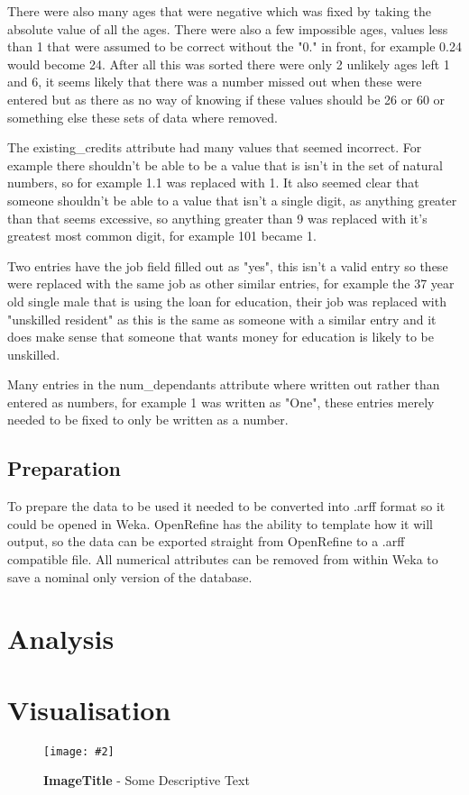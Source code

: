 \documentclass[12pt, a4paper]{article}
\newcommand{\figuremacro}[5]{
	\begin{figure}[#1]
		\centering
		\texttt{[image: \#2]}
		\caption[#3]{\textbf{#3}#4}
		\label{fig:#2}
	\end{figure}
}
\begin{document}
	There were also many ages that were negative which was fixed by taking the absolute value of all the ages. There were also a few impossible ages, values less than 1 that were assumed to be correct without the "0." in front, for example 0.24 would become 24. After all this was sorted there were only 2 unlikely ages left 1 and 6, it seems likely that there was a number missed out when these were entered but as there as no way of knowing if these values should be 26 or 60 or something else these sets of data where removed.
	
	The existing\_credits attribute had many values that seemed incorrect. For example there shouldn't be able to be a value that is isn't in the set of natural numbers, so for example 1.1 was replaced with 1. It also seemed clear that someone shouldn't be able to a value that isn't a single digit, as anything greater than that seems excessive, so anything greater than 9 was replaced with it's greatest most common digit, for example 101 became 1.
	
	Two entries have the job field filled out as "yes", this isn't a valid entry so these were replaced with the same job as other similar entries, for example the 37 year old single male that is using the loan for education, their job was replaced with "unskilled resident" as this is the same as someone with a similar entry and it does make sense that someone that wants money for education is likely to be unskilled.
	
	Many entries in the num\_dependants attribute where written out rather than entered as numbers, for example 1 was written as "One", these entries merely needed to be fixed to only be written as a number.
	
	\subsection{Preparation}
	To prepare the data to be used it needed to be converted into .arff format so it could be opened in Weka. OpenRefine has the ability to template how it will output, so the data can be exported straight from OpenRefine to a .arff compatible file. All numerical attributes can be removed from within Weka to save a nominal only version of the database.
	
	\section{Analysis}
	
	\section{Visualisation}
	
	\figuremacro{h}{placeholder}{ImageTitle}{ - Some Descriptive Text}{1.0}
	
	
\end{document}
